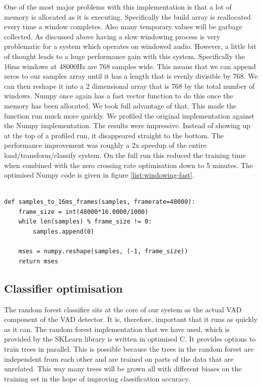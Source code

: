 \documentclass[ %
                    author={Sam Phippen},
                supervisor={Dr. Rafal Bogacz},
                     title={Real time voice activity detectors in noisy personal computing environments},
                  subtitle={},
                    degree={MEng},
                      year={2012} ]{thesis}
\begin{document}
One of the most major problems with this implementation is that a lot of memory
is allocated as it is executing. Specifically the build array is reallocated
every time a window completes. Also many temporary values will be garbage
collected. As discussed above having a slow windowing process is very
problematic for a system which operates on windowed audio. However, a little
bit of thought leads to a huge performance gain with this system. Specifically
the 16ms windows at 48000Hz are 768 samples wide. This means that we can append
zeros to our samples array until it has a length that is evenly divisible by
768. We can then reshape it into a 2 dimensional array that is 768 by the total
number of windows. Numpy once again has a fast vector function to do this once
the memory has been allocated. We took full advantage of that. This made the
function run much more quickly.  We profiled the original implementation
against the Numpy implementation. The results were impressive. Instead of
showing up at the top of a profiled run, it disappeared straight to the bottom.
The performance improvement was roughly a 2x speedup of the entire
load/transform/classify system. On the full run this reduced the training time
when combined with the zero crossing rate optimisation down to 5 minutes. The
optimised Numpy code is given in figure \ref{list:windowing-fast}.

\begin{lstlisting}[frame=single,caption=Optimised windowing implementation, label=list:windowing-fast]

def samples_to_16ms_frames(samples, framerate=48000):
    frame_size = int(48000*16.0000/1000)
    while len(samples) % frame_size != 0:
        samples.append(0)

    mses = numpy.reshape(samples, (-1, frame_size))
    return mses

\end{lstlisting}

\subsection{Classifier optimisation}

The random forest classifier sits at the core of our system as the actual VAD
component of the VAD detector. It is, therefore, important that it runs as
quickly as it can. The random forest implementation that we have used, which is
provided by the SKLearn library is written in optimised C. It provides options
to train trees in parallel. This is possible because the trees in the random
forest are independent from each other and are trained on parts of the data
that are unrelated. This way many trees will be grown all with different biases
on the training set in the hope of improving classification accuracy.
\end{document}
